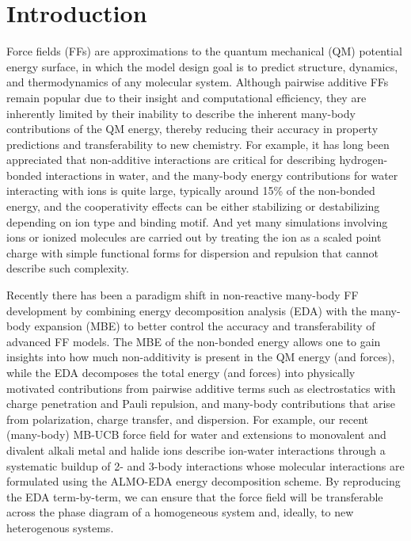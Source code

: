 \documentclass[journal=jctcce,manuscript=article]{achemso}
\begin{document}
\section*{Introduction}
Force fields (FFs) are approximations to the quantum mechanical (QM) potential energy surface, in which the model design goal is to predict structure, dynamics, and thermodynamics of any molecular system. Although pairwise additive FFs remain popular due to their insight and computational efficiency, they are inherently limited by their inability to describe the inherent many-body contributions of the QM energy, thereby reducing their accuracy in property predictions and transferability to new chemistry. For example, it has long been appreciated that non-additive interactions are critical for describing hydrogen-bonded interactions in water\cite{xantheas2000cooperativity}, and the many-body energy contributions for water interacting with ions is quite large, typically around 15\% of the non-bonded energy, and the cooperativity effects can be either stabilizing or destabilizing depending on ion type and binding motif.\cite{heindel2021many,herman2021many} And yet many simulations involving ions or ionized molecules are carried out by treating the
ion as a scaled point charge with simple functional forms for dispersion and repulsion that cannot describe such complexity.\cite{leontyev2011accounting,bedrov2019molecular}

Recently there has been a paradigm shift in non-reactive many-body FF development by combining energy decomposition analysis (EDA)\cite{Szalewicz:2012:SAPT,Patkowski:2020:SAPT,Mao:2021:EDA-review} with the many-body expansion (MBE)\cite{demerdash2017assessing,heindel2020many,heindel2023many} to better control the accuracy and transferability of advanced FF models. The MBE of the non-bonded energy\cite{heindel2020many,heindel2021many,herman2021many} allows one to gain insights into how much non-additivity is present in the QM energy (and forces), while the EDA decomposes the total energy (and forces) into physically motivated contributions from pairwise additive terms such as electrostatics with charge penetration and Pauli repulsion, and many-body contributions that arise from polarization, charge transfer, and dispersion. For example, our recent (many-body) MB-UCB force field for water\cite{das2019development} and extensions to monovalent and divalent alkali metal and halide ions\cite{das2022development} describe ion-water interactions through a systematic buildup of 2- and 3-body interactions whose molecular interactions are formulated using the ALMO-EDA energy decomposition scheme.\cite{mao2021intermolecular} By reproducing the EDA term-by-term, we can ensure that the force field will be transferable across the phase diagram of a homogeneous system and, ideally, to new heterogenous systems.
\end{document}
